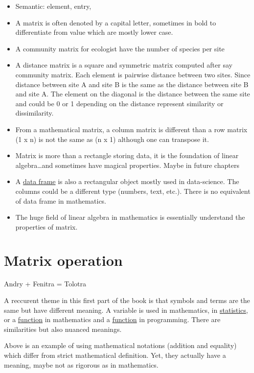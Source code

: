 \documentclass[
  letterpaper,
  DIV=11,
  numbers=noendperiod]{scrreprt}
\providecommand{\tightlist}{%
  \setlength{\itemsep}{0pt}\setlength{\parskip}{0pt}}
\begin{document}
\begin{itemize}
\tightlist
\item
  Semantic: element, entry,
\item
  A matrix is often denoted by a capital letter, sometimes in bold to
  differentiate from value which are mostly lower case.
\item
  A community matrix for ecologist have the number of species per site
\item
  A distance matrix is a square and symmetric matrix computed after say
  community matrix. Each element is pairwise distance between two sites.
  Since distance between site A and site B is the same as the distance
  between site B and site A. The element on the diagonal is the distance
  between the same site and could be 0 or 1 depending on the distance
  represent similarity or dissimilarity.
\item
  From a mathematical matrix, a column matrix is different than a row
  matrix (1 x n) is not the same as (n x 1) although one can transpose
  it.
\item
  Matrix is more than a rectangle storing data, it is the foundation of
  linear algebra\ldots and sometimes have magical properties. Maybe in
  future chapters
\item
  A \href{@sec-dataframe}{data frame} is also a rectangular object
  mostly used in data-science. The columns could be a different type
  (numbers, text, etc.). There is no equivalent of data frame in
  mathematics.
\item
  The huge field of linear algebra in mathematics is essentially
  understand the properties of matrix.
\end{itemize}

\chapter{Matrix operation}\label{sec-matrixOperationMath}

Andry + Fenitra = Tolotra

A reccurent theme in this first part of the book is that symbols and
terms are the same but have different meaning. A variable is used in
mathematics, in \href{@sec-variable}{statistics}, or a
\href{@sec-functionMath}{function} in mathematics and a
\href{@sec-functionCoding}{function} in programming. There are
similarities but also nuanced meanings.

Above is an example of using mathematical notations (addition and
equality) which differ from strict mathematical definition. Yet, they
actually have a meaning, maybe not as rigorous as in mathematics.
\end{document}
